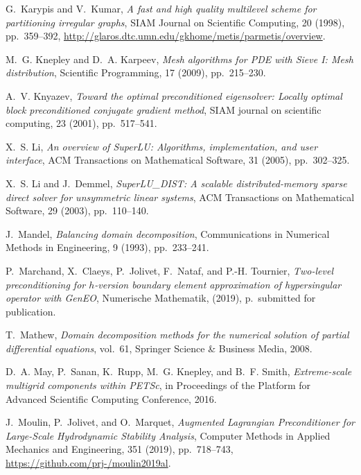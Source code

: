 \documentclass[3p,11pt]{elsarticle}
\begin{document}
\begin{thebibliography}{10}
{\sc G.~Karypis and V.~Kumar}, {\em A fast and high quality multilevel scheme
  for partitioning irregular graphs}, SIAM Journal on Scientific Computing, 20
  (1998), pp.~359--392,
  \url{http://glaros.dtc.umn.edu/gkhome/metis/parmetis/overview}.

{\sc M.~G. Knepley and D.~A. Karpeev}, {\em {Mesh algorithms for PDE with Sieve
  I: Mesh distribution}}, Scientific Programming, 17 (2009), pp.~215--230.

{\sc A.~V. Knyazev}, {\em {Toward the optimal preconditioned eigensolver:
  Locally optimal block preconditioned conjugate gradient method}}, SIAM
  journal on scientific computing, 23 (2001), pp.~517--541.

{\sc X.~S. Li}, {\em {An overview of SuperLU: Algorithms, implementation, and
  user interface}}, ACM Transactions on Mathematical Software, 31 (2005),
  pp.~302--325.

{\sc X.~S. Li and J.~Demmel}, {\em {SuperLU\_DIST: A scalable
  distributed-memory sparse direct solver for unsymmetric linear systems}}, ACM
  Transactions on Mathematical Software, 29 (2003), pp.~110--140.

{\sc J.~Mandel}, {\em Balancing domain decomposition}, Communications in
  Numerical Methods in Engineering, 9 (1993), pp.~233--241.

{\sc P.~Marchand, X.~Claeys, P.~Jolivet, F.~Nataf, and P.-H. Tournier}, {\em
  {Two-level preconditioning for $h$-version boundary element approximation of
  hypersingular operator with GenEO}}, Numerische Mathematik,  (2019),
  p.~submitted for publication.

{\sc T.~Mathew}, {\em Domain decomposition methods for the numerical solution
  of partial differential equations}, vol.~61, Springer Science \& Business
  Media, 2008.

{\sc D.~A. May, P.~Sanan, K.~Rupp, M.~G. Knepley, and B.~F. Smith}, {\em
  {Extreme-scale multigrid components within PETSc}}, in Proceedings of the
  Platform for Advanced Scientific Computing Conference, 2016.

{\sc J.~Moulin, P.~Jolivet, and O.~Marquet}, {\em {Augmented Lagrangian
  Preconditioner for Large-Scale Hydrodynamic Stability Analysis}}, Computer
  Methods in Applied Mechanics and Engineering, 351 (2019), pp.~718--743,
  \url{https://github.com/prj-/moulin2019al}.


\end{thebibliography}
\end{document}
